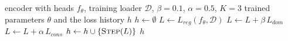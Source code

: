 \begin{algorithm}[t]
\caption{Training with the domain-adversarial and the consistency term.}
\label{alg:train}
\begin{algorithmic}[1]
\Require encoder with heads $f_\theta$, training loader $\mathcal{D}$, $\beta = 0.1$, $\alpha = 0.5$, $K = 3$
\Ensure trained parameters $\theta$ and the loss history $h$
\State $h \gets \emptyset$
  \State $L \gets L_{reg}(f_\theta, \mathcal{D})$
    \State $L \gets L + \beta\, L_{dom}$
  \EndIf
    \State $L \gets L + \alpha\, L_{cons}$
  \EndIf
  \State $h \gets h \cup \{\textsc{Step}(L)\}$
\EndFor
\State \Return $h$
\end{algorithmic}
\end{algorithm}
